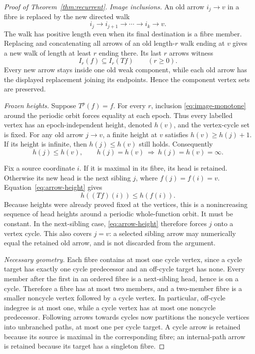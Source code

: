 \begin{proof}[Proof of Theorem~\ref{thm:recurrent}]
\emph{Image inclusions.}
An old arrow $i_j\to v$ in a fibre is replaced by the new directed walk
\[
 i_j\to i_{j+1}\to\cdots\to i_k\to v.
\]
The walk has positive length even when its final destination is a fibre
member. Replacing and concatenating all arrows of an old length-$r$ walk
ending at $v$ gives a new walk of length at least $r$ ending there. Its
last $r$ arrows witness
\begin{equation}\label{eq:image-monotone}
 I_r(f)\subseteq I_r(Tf)\qquad(r\ge0).
\end{equation}
Every new arrow stays inside one old weak component, while each old arrow
has the displayed replacement joining its endpoints. Hence the component
vertex sets are preserved.

\emph{Frozen heights.}
Suppose $T^p(f)=f$. For every $r$, inclusion \eqref{eq:image-monotone}
around the periodic orbit forces equality at each epoch. Thus every
labelled vertex has an epoch-independent height, denoted $h(v)$, and the
vertex-cycle set is fixed. For any old arrow $j\to v$, a finite height
at $v$ satisfies $h(v)\ge h(j)+1$. If its height is infinite, then
$h(j)\le h(v)$ still holds. Consequently
\begin{equation}\label{eq:arrow-height}
 h(j)\le h(v),\qquad
 h(j)=h(v)\ \Longrightarrow\ h(j)=h(v)=\infty.
\end{equation}

Fix a source coordinate $i$. If it is maximal in its fibre, its head is
retained. Otherwise its new head is the next sibling $j$, where
$f(j)=f(i)=v$. Equation~\eqref{eq:arrow-height} gives
\begin{equation}\label{eq:head-height}
 h((Tf)(i))\le h(f(i)).
\end{equation}
Because heights were already proved fixed at the vertices, this is a
nonincreasing sequence of head heights around a periodic whole-function
orbit. It must be constant. In the next-sibling case,
\eqref{eq:arrow-height} therefore forces $j$ onto a vertex cycle. This
also covers $j=v$: a selected sibling arrow may numerically equal the
retained old arrow, and is not discarded from the argument.

\emph{Necessary geometry.}
Each fibre contains at most one cycle vertex, since a cycle target has
exactly one cycle predecessor and an off-cycle target has none. Every
member after the first in an ordered fibre is a next-sibling head, hence
is on a cycle. Therefore a fibre has at most two members, and a two-member
fibre is a smaller noncycle vertex followed by a cycle vertex. In
particular, off-cycle indegree is at most one, while a cycle vertex has
at most one noncycle predecessor. Following arrows towards cycles now
partitions the noncycle vertices into unbranched paths, at most one per
cycle target. A cycle arrow is retained because its source is maximal
in the corresponding fibre; an internal-path arrow is retained because
its target has a singleton fibre.


\end{proof}

